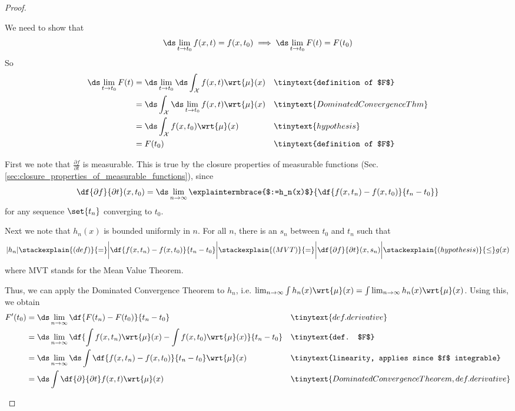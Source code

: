 \documentclass{article} %
\newcommand{\dmu}{\wrt{\mu}}
\begin{document}
\begin{proof}
\begin{alphabate}
\item We need to show that
\[ \ds\lim_{t \to t_0} f(x,t) = f(x,t_0) \implies  \ds\lim_{t \to t_0} F(t) = F(t_0)  \]	
So 
\begin{align*}
\ds\lim_{t \to t_0} F(t) &=   \ds\lim_{t \to t_0} \ds\int_{\mathcal{X}} f(x,t) \dmu(x) && \tinytext{definition of $F$}\\
&= \ds\int_{\mathcal{X}}  \ds\lim_{t \to t_0}  f(x,t) \dmu(x) && \tinytext{Dominated Convergence Thm}\\
&= \ds\int_{\mathcal{X}}  f(x,t_0) \dmu(x) && \tinytext{hypothesis}\\
&= F(t_0) && \tinytext{definition of $F$}
\end{align*}
\item First we note that $\frac{\partial f}{\partial t}$ is measurable.  This is true by the closure properties of measurable functions (Sec. \ref{sec:closure_properties_of_measurable_functions}), since
\[ \df{\partial f}{\partial t}(x,t_0) = \ds\lim_{n \to \infty} \explaintermbrace{$:=h_n(x)$}{\df{f(x, t_n) - f(x,t_0)}{t_n - t_0}} \]
for any sequence $\set{t_n}$ converging to $t_0$.

Next we note that $h_n(x)$ is bounded uniformly in $n$.  For all $n$, there is an $s_n$ between $t_0$ and $t_n$ such that
\[  |h_n| \stackexplain{(def)}{=} \bigg|\df{f(x, t_n) - f(x,t_0)}{t_n - t_0} \bigg| \stackexplain{(MVT)}{=} \bigg| \df{\partial f}{\partial t}(x,s_n) \bigg| \stackexplain{(hypothesis)}{\leq} g(x)\]
where MVT stands for the Mean Value Theorem.

Thus, we can apply the Dominated Convergence Theorem to $h_n$, i.e. $\lim_{n \to \infty} \int h_n(x) \dmu(x) = \int \lim_{n \to \infty} h_n(x) \dmu(x)$.  Using this, we obtain
\begin{align*}
F'(t_0) &= \ds\lim_{n \to \infty} \df{F(t_n) - F(t_0)}{t_n-t_0} && \tinytext{def. derivative} \\
&= \ds\lim_{n \to \infty }	\df{ \int f(x,t_n) \dmu(x)  - \int f(x,t_0) \dmu(x)}{t_n-t_0} && \tinytext{def. $F$} \\
&= \ds\lim_{n \to \infty }	\ds\int \df{ f(x,t_n)  -  f(x,t_0) }{t_n-t_0} \dmu(x) && \tinytext{linearity, applies since $f$ integrable} \\
&= \ds\int \df{\partial}{\partial t} f(x,t) \dmu(x) && \tinytext{Dominated Convergence Theorem, def. derivative}
\end{align*}

\end{alphabate}
	
\end{proof}
\end{document}
